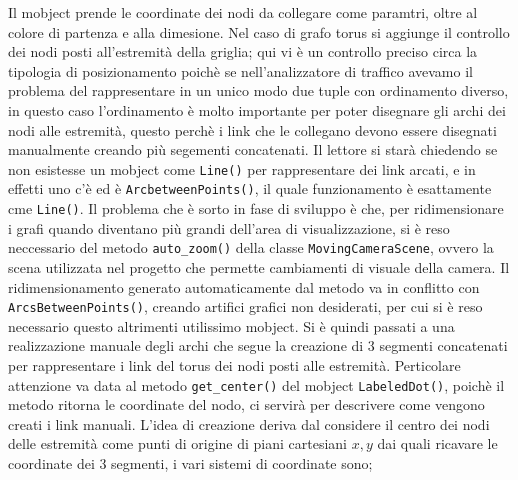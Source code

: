 \documentclass[binding=0.6cm]{sapthesis}
\begin{document}
Il mobject prende le coordinate dei nodi da collegare come paramtri, oltre al colore di partenza e alla dimesione.
Nel caso di grafo torus si aggiunge il controllo dei nodi posti all'estremità della griglia; qui vi è un controllo preciso circa la tipologia di posizionamento poichè se nell'analizzatore di traffico
avevamo il problema del rappresentare in un unico modo due tuple con ordinamento diverso, 
in questo caso l'ordinamento è molto importante per poter disegnare gli archi dei nodi alle estremità, questo perchè i link che le collegano devono essere disegnati manualmente creando più segementi concatenati.
Il lettore si starà chiedendo se non esistesse un mobject come \lstinline|Line()| per rappresentare dei link arcati, e in effetti uno c'è ed è \lstinline|ArcbetweenPoints()|, il quale funzionamento è esattamente cme \lstinline|Line()|.
Il problema che è sorto in fase di sviluppo è che, per ridimensionare i grafi quando diventano più grandi dell'area di visualizzazione, si è reso neccessario del metodo
 \lstinline|auto_zoom()| della classe \lstinline|MovingCameraScene|, ovvero la scena utilizzata nel progetto che permette cambiamenti di visuale della camera.
Il ridimensionamento generato automaticamente dal metodo va in conflitto con \lstinline|ArcsBetweenPoints()|, creando artifici grafici non desiderati, per cui si è reso necessario questo altrimenti utilissimo mobject.
Si è quindi passati a una realizzazione manuale degli archi che segue la creazione di 3 segmenti concatenati per rappresentare i link del torus dei nodi posti alle estremità.
Perticolare attenzione va data al metodo \lstinline|get_center()| del mobject \lstinline|LabeledDot()|, poichè il metodo ritorna le coordinate del nodo, ci servirà per descrivere come vengono creati i link manuali.
L'idea di creazione deriva dal considere il centro dei nodi delle estremità come punti di origine di piani cartesiani \(x, y\) dai quali ricavare le coordinate dei 3 segmenti, i vari sistemi di coordinate sono;
\end{document}
